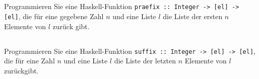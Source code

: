 \documentclass[
  10pt,                   %
  DIV12,
  german,                 %
  oneside,                %
  parskip=half,           %
  headings=normal,        %
  captions=tableheading,  %
]{scrartcl}
\begin{document}
\subsection{}
Programmieren Sie eine Haskell-Funktion \lstinline|praefix :: Integer -> [el] -> [el]|, die für eine gegebene Zahl $n$ und eine Liste $l$ die Liste der ersten $n$ Elemente von $l$ zurück gibt.
\subsection{}
Programmieren Sie eine Haskell-Funktion \lstinline|suffix :: Integer -> [el] -> [el]|, die für eine Zahl $n$ und eine Liste $l$ die Liste der letzten $n$ Elemente von $l$ zurückgibt.
\end{document}
